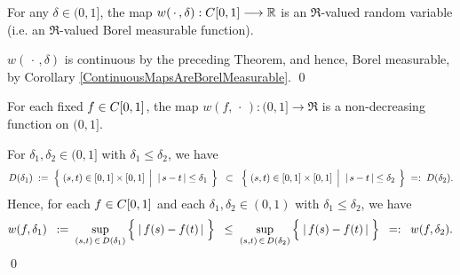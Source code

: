 \begin{corollary}
\mbox{}\vskip 0.1cm
\noindent
For any $\delta \in (0,1]$,
the map
$w(\,\cdot\,,\delta) : C[0,1] \longrightarrow \mathbb{R}$
is an $\Re$-valued random variable (i.e. an $\Re$-valued Borel measurable function).
\end{corollary}
\proof
$w(\,\cdot\,,\delta)$ is continuous by the preceding Theorem, and hence,
Borel measurable, by Corollary \ref{ContinuousMapsAreBorelMeasurable}.
\qed

\begin{proposition}
\label{wNonDecreasingInDelta}
\mbox{}\vskip 0.1cm
\noindent
For each fixed $f \in C[0,1]$,
the map $w(f,\,\cdot\,) : (0,1] \longrightarrow \Re$
is a non-decreasing function on $(0,1]$.
\end{proposition}
\proof
For $\delta_{1}, \delta_{2} \in (0,1]$ with $\delta_{1} \leq \delta_{2}$, we have
\begin{equation*}
	D(\delta_{1})
	\; := \;
	\left\{\;
		(s,t) \in [0,1] \times [0,1]
		\;\left\vert\;\;
		\vert\,s - t\,\vert \overset{{\color{white}.}}{\leq} \delta_{1}
		\right.
	\;\right\}
	\;\;\subset\;\;
	\left\{\;
		(s,t) \in [0,1] \times [0,1]
		\;\left\vert\;\;
		\vert\,s - t\,\vert \overset{{\color{white}.}}{\leq} \delta_{2}
		\right.
	\;\right\}
	\; =: \;
	D(\delta_{2}).
\end{equation*}
Hence, for each $f \in C[0,1]$ and each $\delta_{1}, \delta_{2} \in (0,1)$ with $\delta_{1} \leq \delta_{2}$, we have
\begin{equation*}
w(f,\delta_{1})
\;\;:=\; \sup_{(s,t)\,\in\,D(\delta_{1})}\left\{\;\vert\,f(s)\overset{{\color{white}.}}{-}f(t)\,\vert\;\right\}
\;\;\leq\; \sup_{(s,t)\,\in\,D(\delta_{2})}\left\{\;\vert\,f(s)\overset{{\color{white}.}}{-}f(t)\,\vert\;\right\}
\;\; =: \;\; w(f,\delta_{2}).
\end{equation*}
\qed

